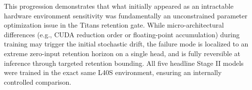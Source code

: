 This progression demonstrates that what initially appeared as an intractable hardware environment sensitivity was fundamentally an unconstrained parameter optimization issue in the Titans retention gate. While micro-architectural differences (e.g., CUDA reduction order or floating-point accumulation) during training may trigger the initial stochastic drift, the failure mode is localized to an extreme zero-input retention horizon on a single head, and is fully reversible at inference through targeted retention bounding. All five headline Stage II models were trained in the exact same L40S environment, ensuring an internally controlled comparison.
